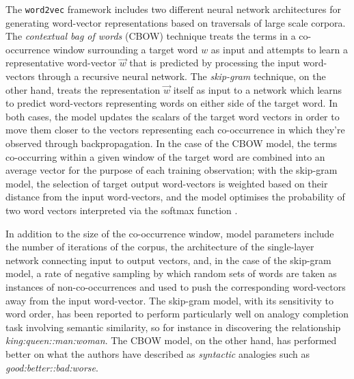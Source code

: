 The \texttt{word2vec} framework includes two different neural network architectures for generating word-vector representations based on traversals of large scale corpora.  The \emph{contextual bag of words} (CBOW) technique treats the terms in a co-occurrence window surrounding a target word $w$ as input and attempts to learn a representative word-vector $\overrightarrow{w}$ that is predicted by processing the input word-vectors through a recursive neural network.  The \emph{skip-gram} technique, on the other hand, treats the representation $\overrightarrow{w}$ itself as input to a network which learns to predict word-vectors representing words on either side of the target word.  In both cases, the model updates the scalars of the target word vectors in order to move them closer to the vectors representing each co-occurrence in which they're observed through backpropagation.  In the case of the CBOW model, the terms co-occurring within a given window of the target word are combined into an average vector for the purpose of each training observation; with the skip-gram model, the selection of target output word-vectors is weighted based on their distance from the input word-vectors, and the model optimises the probability of two word vectors interpreted via the softmax function \citep[see][for more details]{MikolovEA2013c}.

In addition to the size of the co-occurrence window, model parameters include the number of iterations of the corpus, the architecture of the single-layer network connecting input to output vectors, and, in the case of the skip-gram model, a rate of negative sampling by which random sets of words are taken as instances of non-co-occurrences and used to push the corresponding word-vectors away from the input word-vector.  The skip-gram model, with its sensitivity to word order, has been reported to perform particularly well on analogy completion task involving semantic similarity, so for instance in discovering the relationship \emph{king:queen::man:woman}.  The CBOW model, on the other hand, has performed better on what the authors have described as \emph{syntactic} analogies such as \emph{good:better::bad:worse}.

